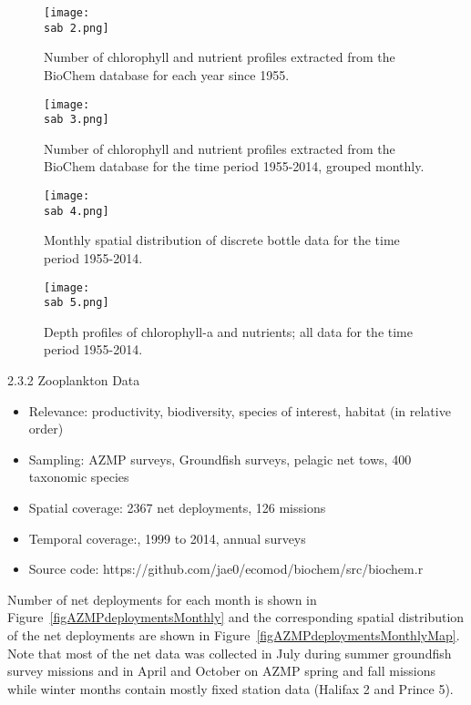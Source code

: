 \documentclass[letterpaper,portrait,11pt]{scrartcl}
\numberwithin{equation}{section}		%
\numberwithin{figure}{section}			%
\numberwithin{table}{section}				%
\newcommand{\ecomod}{\string~/ecomod_data/}   %
\newcommand{\sab}{\ecomod/mpa/sab/}   %
\begin{document}
\begin{figure}
  \centering
  \texttt{[image: \\sab 2.png]}
  \caption{Number of chlorophyll and nutrient profiles extracted from the BioChem database for each year since 1955.}
  \label{figChloroMap}
\end{figure}

\begin{figure}
  \centering
  \texttt{[image: \\sab 3.png]}
  \caption{Number of chlorophyll and nutrient profiles extracted from the BioChem database for the time period 1955-2014, grouped monthly.}
  \label{figChloroFreq}
\end{figure}

\begin{figure}[h]
  \centering
  \texttt{[image: \\sab 4.png]}
  \caption{Monthly spatial distribution of discrete bottle data for the time period 1955-2014.}
  \label{figBottleMap}
\end{figure}

\begin{figure}
  \centering
  \texttt{[image: \\sab 5.png]}
  \caption{Depth profiles of chlorophyll-a and nutrients; all data for the time period 1955-2014.}
  \label{figChloroProfiles}
\end{figure}


2.3.2  Zooplankton Data

\begin{itemize}  
  \item Relevance:  productivity, biodiversity, species of interest, habitat (in relative order)
  \item Sampling:  AZMP surveys, Groundfish surveys, pelagic net tows, 400 taxonomic species
  \item Spatial coverage: 2367 net deployments, 126 missions 
  \item Temporal coverage:,  1999 to 2014, annual surveys
  \item Source code: https://github.com/jae0/ecomod/biochem/src/biochem.r
\end{itemize}

Number of net deployments for each month is shown in Figure~\ref{figAZMPdeploymentsMonthly} and the corresponding spatial distribution of the net deployments are shown in Figure~\ref{figAZMPdeploymentsMonthlyMap}. Note that most of the net data was collected in July during summer groundfish survey missions and in April and October on AZMP spring and fall missions while winter months contain mostly fixed station data (Halifax 2 and Prince 5).
\end{document}
